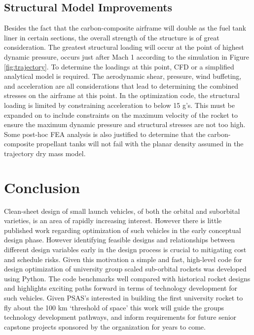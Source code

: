 \documentclass[]{aiaa-tc}%
\begin{document}
\subsection{Structural Model Improvements}
Besides the fact that the carbon-composite airframe will double as the fuel tank liner in certain sections, the overall strength of the structure is of great consideration. The greatest structural loading will occur at the point of highest dynamic pressure, occurs just after Mach 1 according to the simulation in Figure \ref{fig:trajectory}. To determine the loadings at this point, CFD or a simplified analytical model is required. The aerodynamic shear, pressure, wind buffeting, and acceleration are all considerations that lead to determining the combined stresses on the airframe at this point. In the optimization code, the structural loading is limited by constraining acceleration to below 15 g’s. This must be expanded on to include constraints on the maximum velocity of the rocket to ensure the maximum dynamic pressure and structural stresses are not too high. Some post-hoc FEA analysis is also justified to determine that the carbon-composite propellant tanks will not fail with the planar density assumed in the trajectory dry mass model.

\section{Conclusion}
Clean-sheet design of small launch vehicles, of both the orbital and suborbital varieties, is an area of rapidly increasing interest. However there is little published work regarding optimization of such vehicles in the early conceptual design phase. However identifying feasible designs and relationships between different design variables early in the design process is crucial to mitigating cost and schedule risks. Given this motivation a simple and fast, high-level code for design optimization of university group scaled sub-orbital rockets was developed using Python. The code benchmarks well compared with historical rocket designs and highlights exciting paths forward in terms of technology development for such vehicles. Given PSAS's interested in building the first university rocket to fly about the 100 km `threshold of space' this work will guide the groups technology development pathways, and inform requirements for future senior capstone projects sponsored by the organization for years to come.
\end{document}
